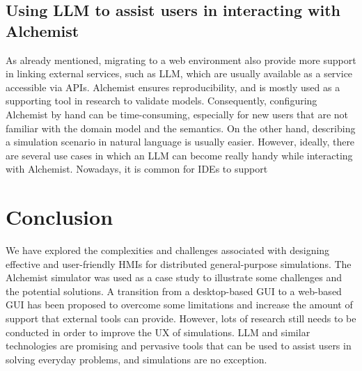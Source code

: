 \documentclass[conference]{IEEEtran}
\begin{document}
\subsection{Using \ac{LLM} to assist users in interacting with Alchemist}
As already mentioned,
migrating to a web environment also provide more support in linking external services,
such as \ac{LLM},
which are usually available as a service accessible via \acp{API}.
%
Alchemist ensures reproducibility,
and is mostly used as a supporting tool in research to validate models.
%
Consequently,
configuring Alchemist by hand can be time-consuming,
especially for new users that are not familiar with the domain model and the semantics.
%
On the other hand,
describing a simulation scenario in natural language is usually easier.
%
However,
ideally,
there are several use cases in which an \ac{LLM} can become really handy while interacting with Alchemist.
%
Nowadays,
it is common for \acp{IDE} to support
\section{Conclusion}
We have explored the complexities and challenges associated with designing effective and user-friendly \acp{HMI} for distributed general-purpose simulations.
%
The Alchemist simulator was used as a case study to illustrate some challenges and the potential solutions.
%
A transition from a desktop-based \ac{GUI} to a web-based \ac{GUI} has been proposed to overcome some limitations and increase the amount of support that external tools can provide.
%
However,
lots of research still needs to be conducted in order to improve the \ac{UX} of simulations.
%
\ac{LLM} and similar technologies are promising and pervasive tools that can be used to assist users in solving everyday problems,
and simulations are no exception.
%


\vspace{12pt}
\end{document}
